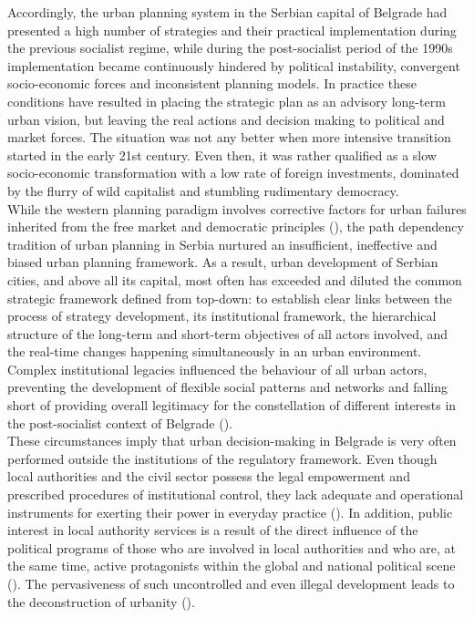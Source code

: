 \documentclass[11pt]{report}
\begin{document}
{{{{Accordingly, the urban planning system in the Serbian capital of Belgrade had presented a high number of strategies and their practical implementation during the previous socialist regime, while during the post-socialist period of the 1990s implementation became continuously hindered by political instability, convergent socio-economic forces and inconsistent planning models.
In practice these conditions have resulted in placing the strategic plan as an advisory long-term urban vision, but leaving the real actions and decision making to political and market forces.
The situation was not any better when more intensive transition started in the early 21st century. Even then, it was rather qualified as a slow socio-economic transformation with a low rate of foreign investments, dominated by the flurry of wild capitalist and stumbling rudimentary democracy.
\\

While the western planning paradigm involves corrective factors for urban failures inherited from the free market and democratic principles (\href{nedovic}{\citealt{nedovic-budic_adjustment_2001}}), the path dependency tradition of urban planning in Serbia nurtured an insufficient, ineffective and biased urban  planning  framework.
As a result, urban development of Serbian cities, and above all its capital, most often has exceeded and diluted the common strategic framework defined from top-down: to establish clear links between the process of strategy development, its institutional framework, the hierarchical structure of the long-term and short-term objectives of all actors involved, and the real-time changes happening simultaneously in an urban environment.  
Complex institutional  legacies  influenced  the  behaviour  of  all  urban  actors,  preventing  the  development  of  flexible  social  patterns  and networks and falling short of providing overall legitimacy for the constellation of different interests in the post-socialist context of Belgrade (\href{Petrovic}{\citealt{petrovic_cities_2009}}).
\\

These circumstances imply that urban decision-making in Belgrade is very often performed outside the institutions of the regulatory framework. Even though local authorities and the civil sector possess the legal empowerment and prescribed procedures of institutional control, they lack adequate and operational instruments for exerting their power in everyday practice   (\href{Bajec}{\citealt{bajec_rational_2009}}).
In addition, public interest in local authority services is a result of the direct influence of the political programs of those who are involved in local authorities and who are, at the same time, active protagonists within the global and national political scene  (\href{Djokic}{\citealt{djokic_political_2007}}). The pervasiveness of such uncontrolled and even illegal development leads to the deconstruction of urbanity (\href{Vujovic}{\citealt{vujovic_belgrades_2007}}).
\\

}}}}
\end{document}
